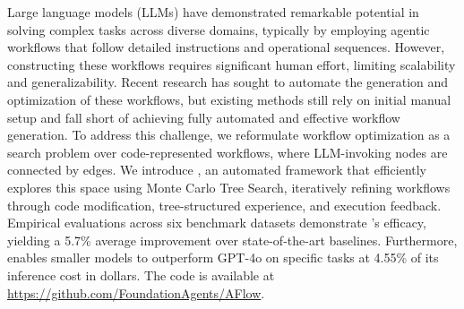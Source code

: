 

Large language models (LLMs) have demonstrated remarkable potential in solving complex tasks across diverse domains, typically by employing agentic workflows that follow detailed instructions and operational sequences. However, constructing these workflows requires significant human effort, limiting scalability and generalizability. Recent research has sought to automate the generation and optimization of these workflows, but existing methods still rely on initial manual setup and fall short of achieving fully automated and effective workflow generation. To address this challenge, we reformulate workflow optimization as a search problem over code-represented workflows, where LLM-invoking nodes are connected by edges. We introduce \modelbold, an automated framework that efficiently explores this space using Monte Carlo Tree Search, iteratively refining workflows through code modification, tree-structured experience, and execution feedback. Empirical evaluations across six benchmark datasets demonstrate \model's efficacy, yielding a 5.7\% average improvement over state-of-the-art baselines. Furthermore, \model enables smaller models to outperform GPT-4o on specific tasks at 4.55\% of its inference cost in dollars. The code is available at \href{https://github.com/FoundationAgents/AFlow}{https://github.com/FoundationAgents/AFlow}.




